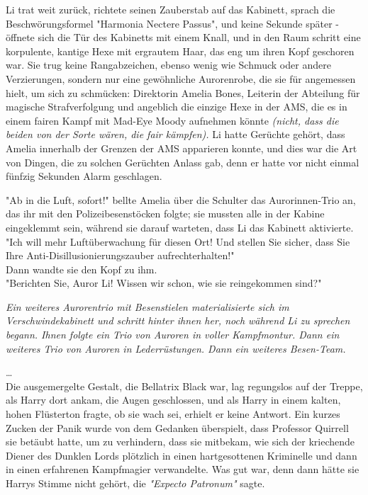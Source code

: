 {Li trat weit zurück, richtete seinen Zauberstab auf das Kabinett, sprach die Beschwörungsformel "Harmonia Nectere Passus", und keine Sekunde später - öffnete sich die Tür des Kabinetts mit einem Knall, und in den Raum schritt eine korpulente, kantige Hexe mit ergrautem Haar, das eng um ihren Kopf geschoren war. Sie trug keine Rangabzeichen, ebenso wenig wie Schmuck oder andere Verzierungen, sondern nur eine gewöhnliche Aurorenrobe, die sie für angemessen hielt, um sich zu schmücken: Direktorin Amelia Bones, Leiterin der Abteilung für magische Strafverfolgung und angeblich die einzige Hexe in der AMS, die es in einem fairen Kampf mit Mad-Eye Moody aufnehmen könnte \emph{(nicht, dass die beiden von der Sorte wären, die fair kämpfen).} Li hatte Gerüchte gehört, dass Amelia innerhalb der Grenzen der AMS apparieren konnte, und dies war die Art von Dingen, die zu solchen Gerüchten Anlass gab, denn er hatte vor nicht einmal fünfzig Sekunden Alarm geschlagen.

"Ab in die Luft, sofort!" bellte Amelia über die Schulter das Aurorinnen-Trio an, das ihr mit den Polizeibesenstöcken folgte; sie mussten alle in der Kabine eingeklemmt sein, während sie darauf warteten, dass Li das Kabinett aktivierte.\\ "Ich will mehr Luftüberwachung für diesen Ort! Und stellen Sie sicher, dass Sie Ihre Anti-Disillusionierungszauber aufrechterhalten!"\\ Dann wandte sie den Kopf zu ihm.\\ "Berichten Sie, Auror Li! Wissen wir schon, wie sie reingekommen sind?"

\emph{Ein weiteres Aurorentrio mit Besenstielen materialisierte sich im Verschwindekabinett und schritt hinter ihnen her, noch während Li zu sprechen begann. Ihnen folgte ein Trio von Auroren in voller Kampfmontur. Dann ein weiteres Trio von Auroren in Lederrüstungen. Dann ein weiteres Besen-Team.}

…\\ Die ausgemergelte Gestalt, die Bellatrix Black war, lag regungslos auf der Treppe, als Harry dort ankam, die Augen geschlossen, und als Harry in einem kalten, hohen Flüsterton fragte, ob sie wach sei, erhielt er keine Antwort. Ein kurzes Zucken der Panik wurde von dem Gedanken überspielt, dass Professor Quirrell sie betäubt hatte, um zu verhindern, dass sie mitbekam, wie sich der kriechende Diener des Dunklen Lords plötzlich in einen hartgesottenen Kriminelle und dann in einen erfahrenen Kampfmagier verwandelte. Was gut war, denn dann hätte sie Harrys Stimme nicht gehört, die \emph{"Expecto Patronum"} sagte.

}
